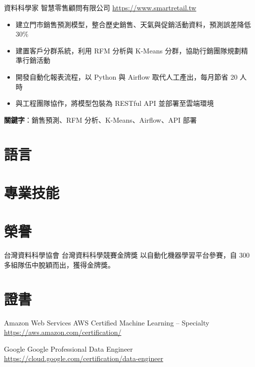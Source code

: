 \documentclass[a4paper, serif, 10pt]{moderncv}
\begin{document}
        {資料科學家}
        {智慧零售顧問有限公司}
        {\url{https://www.smartretail.tw}}
        {}
        {\begin{itemize}
\item 建立門市銷售預測模型，整合歷史銷售、天氣與促銷活動資料，預測誤差降低 30\%
\item 建置客戶分群系統，利用 RFM 分析與 K-Means 分群，協助行銷團隊規劃精準行銷活動
\item 開發自動化報表流程，以 Python 與 Airflow 取代人工產出，每月節省 20 人時
\item 與工程團隊協作，將模型包裝為 RESTful API 並部署至雲端環境
\end{itemize}
\textbf{關鍵字}：銷售預測、RFM 分析、K-Means、Airflow、API 部署}
\section{語言}

\section{專業技能}

\section{榮譽}

        {台灣資料科學協會}
        {台灣資料科學競賽金牌獎}
        {}
        {}
        {以自動化機器學習平台參賽，自 300 多組隊伍中脫穎而出，獲得金牌獎。}
\section{證書}

        {Amazon Web Services}
        {AWS Certified Machine Learning – Specialty}
        {\url{https://aws.amazon.com/certification/}}
        {}
        {}

        {Google}
        {Google Professional Data Engineer}
        {\url{https://cloud.google.com/certification/data-engineer}}
        {}
        {}
\end{document}
